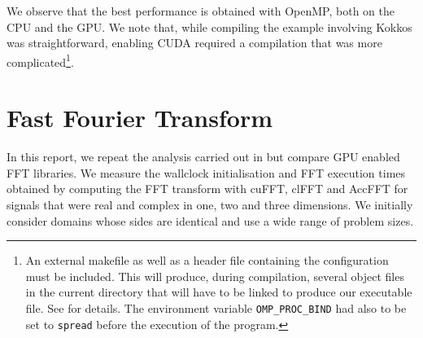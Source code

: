 \documentclass[12pt, a4paper]{article}
\begin{document}
We observe that the best performance is obtained with OpenMP, both on
the CPU and the GPU. We note that, while compiling the example
involving Kokkos was straightforward, enabling CUDA required a
compilation that was more complicated\footnote{An external makefile as
  well as a header file containing the configuration must be
  included. This will produce, during compilation, several object
  files in the current directory that will have to be linked to
  produce our executable file. See \cite{KOKKOSDOC} for details. The
  environment variable \texttt{OMP\_PROC\_BIND} had also to be set to
  \texttt{spread} before the execution of the program.}.

\section{Fast Fourier Transform}\label{FFT}
In this report, we repeat the analysis carried out in \cite{FFTREPORT}
but compare GPU enabled FFT libraries. We measure the wallclock
initialisation and FFT execution times obtained by computing the FFT
transform with cuFFT, clFFT and AccFFT for signals that were real and
complex in one, two and three dimensions. We initially consider
domains whose sides are identical and use a wide range of problem
sizes.
\end{document}

